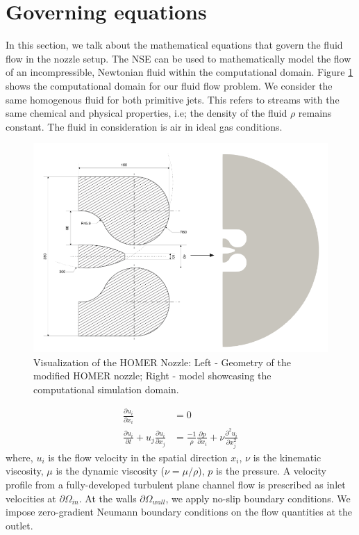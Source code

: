 \section{Governing equations} \label{goveq}
In this section, we talk about the mathematical equations that govern the fluid flow in the nozzle setup. The \gls{NSE} can be used to mathematically model the flow of an incompressible, Newtonian fluid within the computational domain. Figure \ref{fig:Domain} shows the computational domain for our fluid flow problem. We consider the same homogenous fluid for both primitive jets. This refers to streams with the same chemical and physical properties, i.e; the density of the fluid $\rho$ remains constant. The fluid in consideration is air in ideal gas conditions. 
\begin{figure}[ht]
  \centering
  \includegraphics[width=12cm]{images/Theory-CFD/Flow Domain.png}
  \caption{Visualization of the HOMER Nozzle: Left - Geometry of the modified HOMER nozzle; Right -  model showcasing the computational simulation domain.}
  \label{fig:Domain}
\end{figure}
\begin{equation}
  \begin{aligned}
  \frac{\partial u_i}{\partial x_i}&=0\\
  \frac{\partial u_i}{\partial t}+u_j \frac{\partial u_i}{\partial x_j}&=\frac{-1}{\rho} \frac{\partial p}{\partial x_i}+\nu \frac{\partial^2 u_i}{\partial x_j^2}
  \end{aligned}
  \end{equation}
where, $u_i$ is the flow velocity in the spatial direction $x_i$, $\nu$ is the kinematic viscosity, $\mu$ is the dynamic viscosity ($\nu = \mu / \rho$), $p$ is the pressure. A velocity profile from a fully-developed turbulent plane channel flow is prescribed as inlet velocities at $\partial{\Omega_{in}}$. At the walls $\partial{\Omega_{wall}}$, we apply no-slip boundary conditions. We impose zero-gradient Neumann boundary conditions on the flow quantities at the outlet.\\
